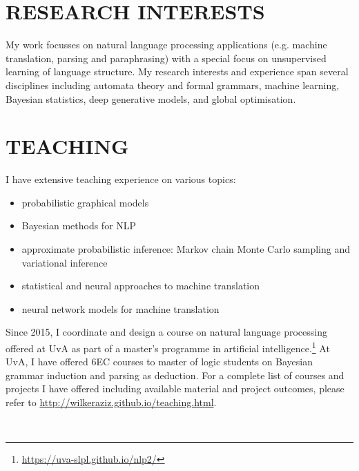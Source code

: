 \section*{RESEARCH INTERESTS}

My work focusses on natural language processing applications (e.g. machine translation, parsing and paraphrasing) with a special focus on unsupervised learning of language structure. 
My research interests and experience span several disciplines including automata theory and formal grammars, machine learning,  Bayesian statistics, deep generative models, and global optimisation.

\section*{TEACHING}

I have extensive teaching experience on various topics:
\begin{itemize}
	\item probabilistic graphical models
	\item Bayesian methods for NLP
	\item approximate probabilistic inference: Markov chain Monte Carlo sampling and variational inference
	\item statistical and neural approaches to machine translation
	\item neural network models for machine translation
\end{itemize}

Since 2015, I coordinate and design a course on natural language processing offered at UvA as part of a master's programme in artificial intelligence.\footnote{\url{https://uva-slpl.github.io/nlp2/}}
At UvA, I have offered 6EC courses to master of logic students on Bayesian grammar induction and parsing as deduction.
For a complete list of courses and projects I have offered including available material and project outcomes, please refer to \url{http://wilkeraziz.github.io/teaching.html}.

~



